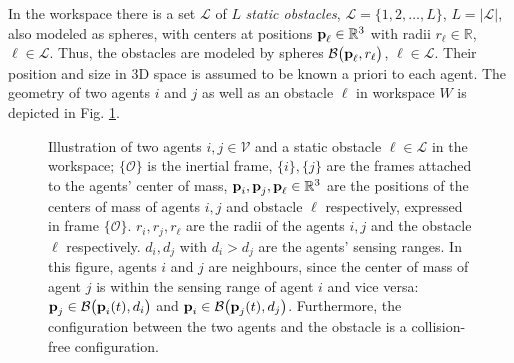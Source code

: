 In the workspace there is a set $\mathcal{L}$ of $L$ \textit{static obstacles},
$\mathcal{L} = \{1, 2, \dots, L\}$,
$L = |\mathcal{L}|$, also modeled as spheres, with centers at positions
$\bm{\mathbf{p}}_{\ell} \in \mathbb{R}^3$ with radii
$r_{\ell}\in \mathbb{R}$, $\ell \in \mathcal{L}$. Thus, the obstacles are
modeled by spheres
$\mathcal{B}\big(\bm{\mathbf{p}}_{\ell}, r_{\ell}\big)$, $\ell \in \mathcal{L}$.
Their position and size in 3D space is assumed to be known a priori
to each agent. The geometry of two agents $i$ and $j$ as well as an obstacle
$\ell$ in workspace $W$ is depicted in Fig. \ref{fig:two_agents_one_obstacle}.

\begin{figure}[ht!]
	\centering
    
    \caption{Illustration of two agents $i, j \in \mathcal{V}$ and a static
      obstacle $\ell \in \mathcal{L}$ in the workspace; $\{\mathcal{O}\}$ is the inertial
      frame, $\{i\}, \{j\}$ are the frames attached to the agents' center of
      mass, $\bm{\mathbf{p}}_i, \bm{\mathbf{p}}_j, \bm{\mathbf{p}}_{\ell} \in \mathbb{R}^3$ are the
      positions of the centers of mass of agents $i,j$ and obstacle $\ell$
      respectively, expressed in frame $\{\mathcal{O}\}$. $r_i, r_j, r_{\ell}$
      are the radii of the agents $i,j$ and the obstacle $\ell$ respectively.
      $d_i, d_j$ with $d_i > d_j$ are the agents' sensing ranges.
      In this figure, agents $i$ and $j$ are neighbours, since the center
      of mass of agent $j$ is within the sensing range of agent $i$ and vice
      versa: $\bm{\mathbf{p}}_j \in \mathcal{B}\big(\bm{\mathbf{p}}_i(t), d_i\big)$ and
      $\bm{\mathbf{p}}_i \in \mathcal{B}\big(\bm{\mathbf{p}}_j(t), d_j\big)$. Furthermore, the
      configuration between the two agents and the obstacle is a collision-free
      configuration.}
	\label{fig:two_agents_one_obstacle}
\end{figure}

